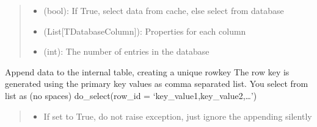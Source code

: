 \documentclass[letterpaper,10pt,english]{sphinxmanual}
\begin{document}
\begin{savenotes}
\begin{fulllineitems}
\begin{quote}
\begin{description}
\begin{itemize}
\item {} 
\sphinxAtStartPar
{} \textendash{} (bool): If True, select data from cache, else select from database

\item {} 
\sphinxAtStartPar
{} \textendash{} (List{[}TDatabaseColumn{]}): Properties for each column

\item {} 
\sphinxAtStartPar
{} \textendash{} (int): The number of entries in the database

\end{itemize}

\end{description}\end{quote}

\begin{savenotes}\begin{fulllineitems}
\label{\detokenize{eezz:eezz.database.TDatabaseTable.append}}
\pysigstartsignatures
{}
\pysigstopsignatures
\sphinxAtStartPar
Append data to the internal table, creating a unique row\sphinxhyphen{}key
The row key is generated using the primary key values as comma separated list. You select from list as (no spaces)
do\_select(row\_id = ‘key\_value1,key\_value2,…’)
\begin{quote}\begin{description}
\begin{itemize}
\item {} 
\sphinxAtStartPar
{} \textendash{} If set to True, do not raise exception, just ignore the appending silently


\end{itemize}
\end{description}
\end{quote}
\end{fulllineitems}
\end{savenotes}
\end{fulllineitems}
\end{savenotes}
\end{document}
